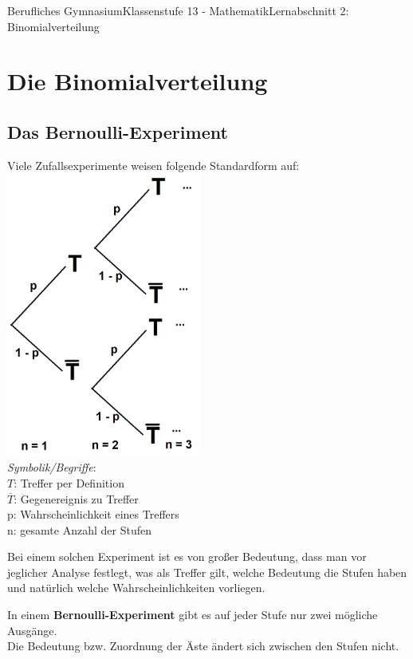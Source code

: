 \documentclass[11pt,twocolumn,oneside,openany,headings=optiontotoc,11pt,numbers=noenddot]{article}
\begin{document}
	\begin{worksheet}{Berufliches Gymnasium}{Klassenstufe 13 - Mathematik}{Lernabschnitt 2: Binomialverteilung}
		\setcounter{section}{1}
		\section{Die Binomialverteilung}
		\subsection{Das Bernoulli-Experiment}
		Viele Zufallsexperimente weisen folgende Standardform auf:\\
		\includegraphics[width=0.48\textwidth]{../99_Bilder/04_WKR/bern.png}\\
		\textit{Symbolik/Begriffe}:\\
		\(T\): \grqq{}Treffer\grqq{} per Definition\\
		\(\overline{T}\): Gegenereignis zu \grqq{}Treffer\grqq{}\\
		p: Wahrscheinlichkeit eines Treffers\\
		n: gesamte Anzahl der Stufen\\
		\par\noindent
		Bei einem solchen Experiment ist es von großer Bedeutung, dass man vor jeglicher Analyse festlegt, was als Treffer gilt, welche Bedeutung die Stufen haben und natürlich welche Wahrscheinlichkeiten vorliegen.
		\begin{framed}
			\noindent
			In einem \textbf{Bernoulli-Experiment} gibt es auf jeder Stufe nur zwei mögliche Ausgänge.\\
			Die Bedeutung bzw. Zuordnung der Äste ändert sich zwischen den Stufen nicht.\\

\end{framed}
\end{worksheet}
\end{document}
